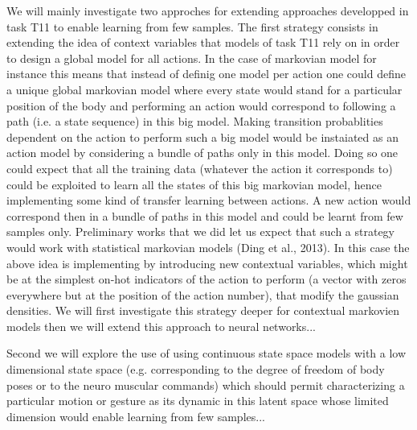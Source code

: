 We will mainly investigate two approches for extending approaches developped in task T11 to enable learning from few samples. The first strategy consists in extending the idea of context variables that models of task T11 rely on in order to design a global model for all actions.
In the case of markovian model for instance this means that instead of definig one model per action one could define a unique global markovian model where every state would stand for a particular position of the body and performing an action would correspond to following a path (i.e. a state sequence) in this big model. 
Making transition probablities dependent on the action to perform such a big model would be instaiated as an action model by considering a bundle of paths only in this model.  Doing so one could expect that all the training data (whatever the action it corresponds to) could be exploited to learn all the states of this big markovian model, hence implementing some kind of transfer learning between actions. 
A new action would correspond then in a bundle of paths in this model and could be learnt from few samples only. Preliminary works that we did let us expect that such a strategy would work with statistical markovian models (Ding et al., 2013). In this case the above idea is implementing by introducing new contextual variables, which might be at the simplest on-hot indicators 
of the action to perform (a vector with zeros everywhere but at the position of the action number), 
that modify the gaussian densities. We will first investigate this strategy deeper for contextual markovien models then we will extend this approach to neural networks...

Second we will explore the use of using continuous state space models with a low dimensional state space (e.g. corresponding to the degree of freedom of body poses or to the neuro muscular commands) which should permit characterizing a particular motion or gesture as its dynamic in this latent space whose limited dimension would enable learning from few samples...


